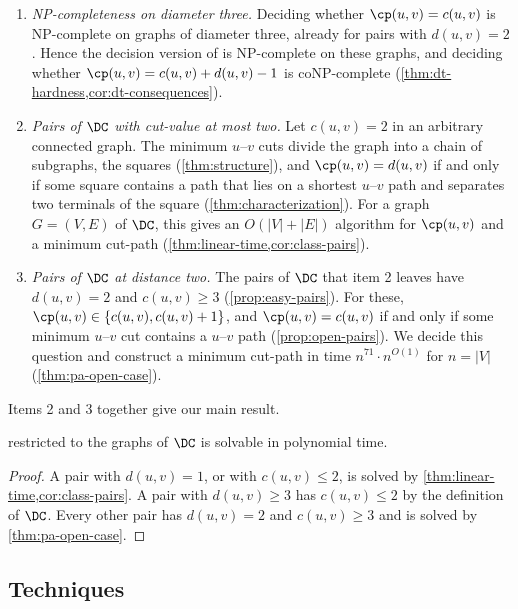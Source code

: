 \begin{enumerate}
\item \emph{NP-completeness on diameter three.}
Deciding whether $\cp(u, v) = c(u, v)$ is NP-complete on graphs of diameter three, already for pairs with $d(u, v) = 2$.
Hence the decision version of \MinCutPath{} is NP-complete on these graphs, and deciding whether $\cp(u, v) = c(u, v) + d(u, v) - 1$ is coNP-complete (\cref{thm:dt-hardness,cor:dt-consequences}).

\item \emph{Pairs of $\DC$ with cut-value at most two.}
Let $c(u, v) = 2$ in an arbitrary connected graph.
The minimum $u$--$v$ cuts divide the graph into a chain of subgraphs, the squares (\cref{thm:structure}), and $\cp(u, v) = d(u, v)$ if and only if some square contains a path that lies on a shortest $u$--$v$ path and separates two terminals of the square (\cref{thm:characterization}).
For a graph $G = (V, E)$ of $\DC$, this gives an $O(|V| + |E|)$ algorithm for $\cp(u, v)$ and a minimum cut-path (\cref{thm:linear-time,cor:class-pairs}).

\item \emph{Pairs of $\DC$ at distance two.}
The pairs of $\DC$ that item 2 leaves have $d(u, v) = 2$ and $c(u, v) \geq 3$ (\cref{prop:easy-pairs}).
For these, $\cp(u, v) \in \{c(u, v), c(u, v) + 1\}$, and $\cp(u, v) = c(u, v)$ if and only if some minimum $u$--$v$ cut contains a $u$--$v$ path (\cref{prop:open-pairs}).
We decide this question and construct a minimum cut-path in time $n^{71} \cdot n^{O(1)}$ for $n = |V|$ (\cref{thm:pa-open-case}).
\end{enumerate}

Items 2 and 3 together give our main result.

\begin{theorem}\label{thm:main}
\MinCutPath{} restricted to the graphs of $\DC$ is solvable in polynomial time.
\end{theorem}

\begin{proof}
A pair with $d(u, v) = 1$, or with $c(u, v) \leq 2$, is solved by \cref{thm:linear-time,cor:class-pairs}.
A pair with $d(u, v) \geq 3$ has $c(u, v) \leq 2$ by the definition of $\DC$.
Every other pair has $d(u, v) = 2$ and $c(u, v) \geq 3$ and is solved by \cref{thm:pa-open-case}.
\end{proof}

\subsection{Techniques}\label{sec:techniques}

